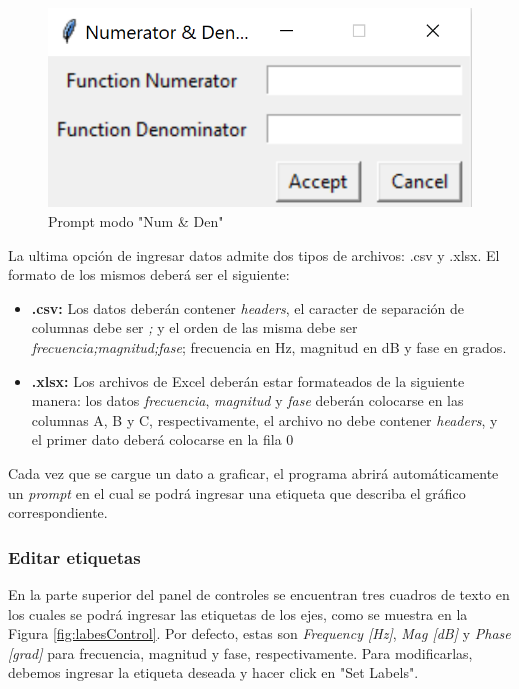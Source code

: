 \begin{figure}[ht]
\centering
\includegraphics[scale=0.3]{resources/numDenPrompt.png}
\caption{Prompt modo "Num \& Den"}
\label{fig:numDenPrompt}
\end{figure}

La ultima opción de ingresar datos admite dos tipos de archivos: .csv y .xlsx. El formato de los mismos deberá ser el siguiente:
\begin{itemize}
\item \textbf{.csv: }Los datos deberán contener \emph{headers}, el caracter de separación de columnas debe ser \emph{;} y el orden de las misma debe ser \emph{frecuencia;magnitud;fase}; frecuencia en Hz, magnitud en dB y fase en grados.
\item \textbf{.xlsx: }Los archivos de Excel deberán estar formateados de la siguiente manera: los datos \emph{frecuencia}, \emph{magnitud} y \emph{fase} deberán colocarse en las columnas A, B y C, respectivamente, el archivo no debe contener \emph{headers}, y el primer dato deberá colocarse en la fila 0
\end{itemize}

Cada vez que se cargue un dato a graficar, el programa abrirá automáticamente un \emph{prompt} en el cual se podrá ingresar una etiqueta que describa el gráfico correspondiente.

\subsubsection{Editar etiquetas}

En la parte superior del panel de controles se encuentran tres cuadros de texto en los cuales se podrá ingresar las etiquetas de los ejes, como se muestra en la Figura \ref{fig:labesControl}. Por defecto, estas son \emph{Frequency [Hz]}, \emph{Mag [dB]} y \emph{Phase [grad]} para frecuencia, magnitud y fase, respectivamente. Para modificarlas, debemos ingresar la etiqueta deseada y hacer click en "Set Labels".

